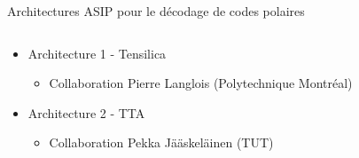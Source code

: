 \documentclass[t,compress,mathserif,12pt,xcolor=dvipsnames]{beamer}
\begin{document}
\begin{frame}[t]{Architectures ASIP pour le décodage de codes polaires}
  \begin{minipage}[t][5.0cm][t]{\textwidth}
    \begin{columns}[T]
      \begin{column}{0.56\textwidth}
        \begin{itemize}
          \item<+-> Architecture 1 - Tensilica
          \begin{itemize}
            \item<1-> Collaboration Pierre Langlois (Polytechnique Montréal)
          \end{itemize}
          \vspace{1.5cm}
          \item<+-> Architecture 2 - TTA
          \begin{itemize}
            \item<2-> Collaboration Pekka Jääskeläinen (TUT)
          \end{itemize}
        \end{itemize}
      \end{column}
      \begin{column}{0.04\textwidth}


\end{column}
\end{columns}
\end{minipage}
\end{frame}
\end{document}
